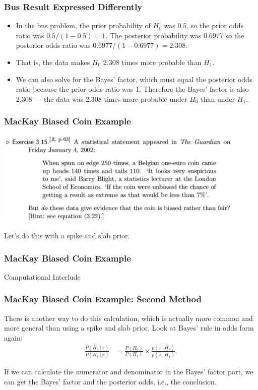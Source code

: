 \documentclass{beamer}
\newcommand{\given}{\,|\,}
\begin{document}
\begin{frame}
\frametitle{Bus Result Expressed Differently}
\begin{itemize}
\item In the bus problem, the prior probability of $H_0$ was 0.5, so the prior
odds ratio was $0.5/(1 - 0.5) = 1$. The posterior probability was
0.6977 so the posterior odds ratio was $0.6977/(1 - 0.6977)=2.308$.\pause
\item That is, the data makes $H_0$ 2.308 times more probable than $H_1$.\pause
\item We can also solve for the Bayes' factor, which must equal the posterior
odds ratio because the prior odds ratio was 1. Therefore the Bayes' factor
is also 2.308 --- the data was 2.308 times more probable under $H_0$ than
under $H_1$.
\end{itemize}


\end{frame}


\begin{frame}
\frametitle{MacKay Biased Coin Example}

\begin{center}
\includegraphics[width=0.9\textwidth]{images/mackay_coin.png}
\end{center}

Let's do this with a spike and slab prior.

\end{frame}

\begin{frame}
\frametitle{MacKay Biased Coin Example}

\centering
Computational Interlude

\end{frame}



\begin{frame}
\frametitle{MacKay Biased Coin Example: Second Method}
There is another way to do this calculation, which is actually more common
and more general than using a spike and slab prior. Look at Bayes' rule
in odds form again:
\begin{align}
\frac{P(H_0 \given x)}{P(H_1 \given x)}
    &= \frac{P(H_0)}{P(H_1)} \times \frac{p(x \given H_0)}{p(x \given H_1)}.
\end{align}
\pause

If we can calculate the numerator and denominator in the Bayes' factor part,
we can get the Bayes' factor and the posterior odds, i.e., the conclusion.
\end{frame}
\end{document}
